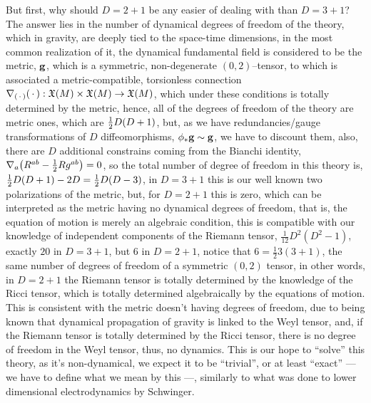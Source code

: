 But first, why should $D=2+1$ be any easier of dealing with than $D=3+1$? The answer lies in the number of dynamical degrees of freedom of the theory, which in gravity, 
are deeply tied to the space-time dimensions, in the most common realization of it, the dynamical fundamental field is considered to be the metric, $\vb g$, 
which is a symmetric, non-degenerate $(0,2)$--tensor, to which is associated a metric-compatible, torsionless connection $\nabla_{\qty(\,\cdot\,)}\qty(\,\cdot\,):\mathfrak X\qty(M)\times \mathfrak X\qty(M)\rightarrow\mathfrak X(M)$, 
which under these conditions is totally determined by the metric, hence, all of the degrees of freedom of the theory are metric ones, which are $\frac12D\qty(D+1)$, but, as we have redundancies/gauge 
transformations of $D$ diffeomorphisms, $\phi_\ast\vb g\sim\vb g$, we have to discount them, also, there are $D$ additional constrains coming from the Bianchi identity, $\nabla_a\qty(R^{ab}-\frac12 Rg^{ab})=0$, 
so the total number of degree of freedom in this theory is, $\frac12D\qty(D+1)-2D=\frac12D\qty(D-3)$,
in $D=3+1$ this is our well known two polarizations of the 
metric, but, for $D=2+1$ this is zero, which can be interpreted as the metric having no dynamical degrees of freedom, that is, the equation of motion 
is merely an algebraic condition, this is compatible with our knowledge of independent components of the Riemann tensor, $\frac{1}{12}D^2(D^2-1)$, exactly $20$ 
in $D=3+1$, but $6$ in $D=2+1$, notice that $6=\frac123(3+1)$, the same number of degrees of freedom of a symmetric $(0,2)$ tensor, in other words, 
in $D=2+1$ the Riemann tensor is totally determined by the knowledge of the Ricci tensor, which is totally determined algebraically by the equations of motion. 
This is consistent with the metric doesn't having degrees 
of freedom, due to being known that dynamical propagation of gravity is linked to the Weyl tensor, and, if the Riemann tensor is totally determined by the 
Ricci tensor, there is no degree of freedom in the Weyl tensor, thus, no dynamics.
This is our hope to ``solve'' this theory, as it's non-dynamical, we expect it to be ``trivial'', or at least ``exact'' --- we have to define what we mean by this ---, 
similarly to what was done to lower dimensional electrodynamics by Schwinger.

